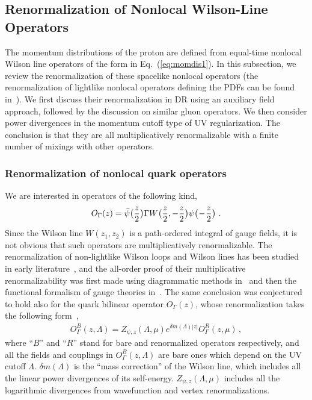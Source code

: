 \documentclass[aps,rmp,reprint,amsmath,amssymb,graphicx,longbibliography]{revtex4-1} %
\begin{document}
\subsection{Renormalization of Nonlocal Wilson-Line Operators}
\label{sec:renorm-nl}
The momentum distributions of the proton are defined from
equal-time nonlocal Wilson line operators of the form in Eq.~(\ref{eq:momdis1}).
In this subsection, we review the renormalization of these spacelike nonlocal operators (the renormalization of lightlike nonlocal operators defining the PDFs can be found in~\cite{Collins:1981uw,Collins:2011zzd}). We first discuss their renormalization in DR using an auxiliary field approach, followed by the discussion on similar
gluon operators. We then consider power divergences
in the momentum cutoff type of UV regularization. The conclusion is that they are
all multiplicatively renormalizable with a finite number of mixings with other operators.

\subsubsection{Renormalization of nonlocal quark operators}

We are interested in operators of the following kind,
\begin{equation}
	O_\Gamma(z)=\bar{\psi}\big({z\over2}\big)\Gamma W\big({z\over2},-{z\over2}\big)\psi\big(\!-\!{z\over2}\big) \ .
\end{equation}
Since the Wilson line $W(z_1,z_2)$ is a path-ordered integral of gauge fields,
it is not obvious that such operators are multiplicatively renormalizable. The renormalization of non-lightlike Wilson loops and Wilson lines has been studied in early literature~\cite{Dotsenko:1979wb,Craigie:1980qs}, and the all-order proof of their multiplicative renormalizability was first made using diagrammatic methods in~\cite{Dotsenko:1979wb,Craigie:1980qs} and then the functional formalism of gauge theories in~\cite{Dorn:1986dt}.
The same conclusion was conjectured to hold also for the quark bilinear operator $O_\Gamma(z)$, whose renormalization takes the following form~\cite{Musch:2010ka,Ishikawa:2016znu,Chen:2016fxx},
\begin{align} \label{eq:schemeren}
	O^B_\Gamma(z,\Lambda)=Z_{\psi,z}(\Lambda,\mu)e^{\delta m(\Lambda)|z|} O^R_\Gamma(z,\mu)\,,
\end{align}
where ``$B$'' and ``$R$'' stand for bare and renormalized operators respectively, and all the fields and couplings in $O^B_\Gamma(z,\Lambda)$ are bare ones which depend on the UV cutoff $\Lambda$. $\delta m(\Lambda)$ is the ``mass correction'' of the Wilson line, which includes all the linear power divergences of its self-energy. $Z_{\psi,z}(\Lambda,\mu)$ includes all the logarithmic divergences from wavefunction and vertex renormalizations.
\end{document}
